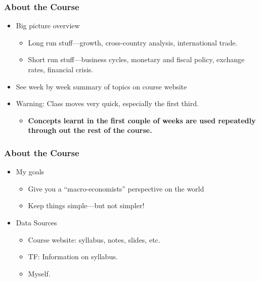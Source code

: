 \documentclass[10pt]{beamer}
\begin{document}

\begin{frame}[t]
\frametitle{About the Course}
\begin{itemize}
\item Big picture overview
\begin{itemize}
\medskip
\item Long run stuff---growth, cross-country analysis, international trade.
\medskip
\item Short run stuff---business cycles, monetary and fiscal policy, exchange rates, financial crisis.
\end{itemize}
\bigskip
\item See week by week summary of topics on course website
\bigskip
\item \begin{alert}{Warning: Class moves very quick, especially the first third.}\end{alert}
\begin{itemize}
\medskip
\item\textbf{Concepts learnt in the first couple of weeks are used repeatedly through out the rest of the course.}
\end{itemize}
\end{itemize}
\end{frame}


\begin{frame}[t]
\frametitle{About the Course}
\begin{itemize}
\item My goals
\begin{itemize}
\medskip
\item Give you a ``macro-economists'' perspective on the world
\medskip
\item Keep things simple---but not simpler!
\end{itemize}
\bigskip
\item Data Sources
\begin{itemize}
\medskip
\item Course website: syllabus, notes, slides, etc.
\medskip
\item TF: Information on syllabus.
\medskip
\item Myself.
\end{itemize}
\end{itemize}
\bigskip
\end{frame}
\end{document}
